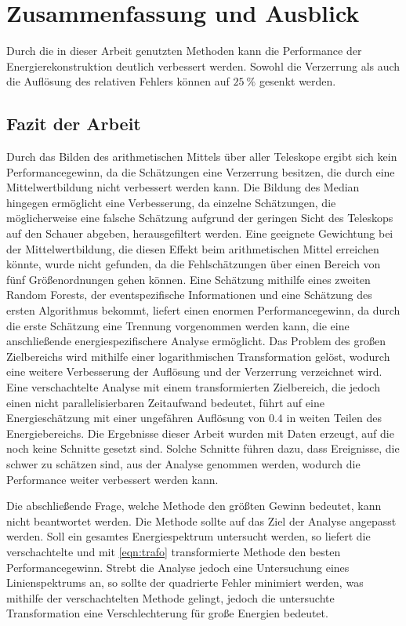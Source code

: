 \chapter{Zusammenfassung und Ausblick}
Durch die in dieser Arbeit genutzten Methoden kann die Performance der Energierekonstruktion deutlich verbessert werden.
Sowohl die Verzerrung als auch die Auflösung des relativen Fehlers können auf $\SI{25}{\percent}$ gesenkt werden.

\section{Fazit der Arbeit}

Durch das Bilden des arithmetischen Mittels über aller Teleskope ergibt sich kein Performancegewinn, da die Schätzungen
eine Verzerrung besitzen, die durch eine Mittelwertbildung nicht verbessert werden kann.
Die Bildung des Median hingegen ermöglicht eine Verbesserung, da einzelne Schätzungen, die möglicherweise
eine falsche Schätzung aufgrund der geringen Sicht des Teleskops auf den Schauer abgeben, herausgefiltert werden.
Eine geeignete Gewichtung bei der Mittelwertbildung, die diesen Effekt beim arithmetischen Mittel erreichen könnte, wurde
nicht gefunden, da die Fehlschätzungen über einen Bereich von fünf Größenordnungen gehen können.
Eine Schätzung mithilfe eines zweiten Random Forests, der eventspezifische Informationen und eine
Schätzung des ersten Algorithmus bekommt, liefert einen enormen Performancegewinn, da durch die erste Schätzung eine
Trennung vorgenommen werden kann, die eine anschließende energiespezifischere Analyse ermöglicht.
Das Problem des großen Zielbereichs wird mithilfe einer logarithmischen Transformation gelöst, wodurch eine weitere
Verbesserung der Auflösung und der Verzerrung verzeichnet wird.
Eine verschachtelte Analyse mit einem transformierten Zielbereich, die jedoch einen nicht parallelisierbaren Zeitaufwand bedeutet,
führt auf eine Energieschätzung mit einer ungefähren Auflösung von $0.4$ in weiten Teilen des
Energiebereichs. Die Ergebnisse dieser Arbeit wurden mit Daten erzeugt, auf die noch keine Schnitte gesetzt sind. Solche
Schnitte führen dazu, dass Ereignisse, die schwer zu schätzen sind, aus der Analyse genommen werden, wodurch die Performance
weiter verbessert werden kann.

Die abschließende Frage, welche Methode den größten Gewinn bedeutet, kann nicht beantwortet werden.
Die Methode sollte auf das Ziel der Analyse angepasst werden.
Soll ein gesamtes Energiespektrum untersucht werden, so liefert die verschachtelte und mit \eqref{eqn:trafo} transformierte Methode
den besten Performancegewinn.
Strebt die Analyse jedoch eine Untersuchung eines Linienspektrums an, so sollte der quadrierte Fehler minimiert werden, was mithilfe
der verschachtelten Methode gelingt, jedoch die untersuchte Transformation eine Verschlechterung für große Energien bedeutet.

